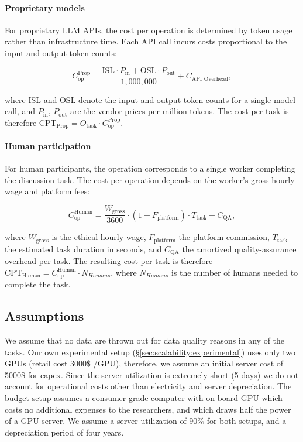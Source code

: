 \paragraph{Proprietary models}

For proprietary LLM APIs, the cost per operation is determined by token usage rather than infrastructure time. Each API call incurs costs proportional to the input and output token counts:

\[
C_{\text{op}}^{\text{Prop}} =
\frac{\text{ISL} \cdot P_{\text{in}} +
	\text{OSL} \cdot P_{\text{out}}}{1{,}000{,}000}
+ C_{\text{API Overhead}},
\]

where ISL and OSL denote the input and output token counts for a single model call, and $P_{\text{in}}$, $P_{\text{out}}$ are the vendor prices per million tokens. The cost per task is therefore $
\text{CPT}_{\text{Prop}} =
O_{\text{task}} \cdot C_{\text{op}}^{\text{Prop}}
$.		

\paragraph{Human participation}

For human participants, the operation corresponds to a single worker completing the discussion task. The cost per operation depends on the worker's gross hourly wage and platform fees:

\[
C_{\text{op}}^{\text{Human}} =
\frac{W_{\text{gross}}}{3600}
\cdot (1 + F_{\text{platform}})
\cdot T_{\text{task}}
+ C_{\text{QA}},
\]

where $W_{\text{gross}}$ is the ethical hourly wage, $F_{\text{platform}}$ the platform commission, $T_{\text{task}}$ the estimated task duration in seconds, and $C_{\text{QA}}$ the amortized quality-assurance overhead per task. The resulting cost per task is therefore $
\text{CPT}_{\text{Human}} =
C_{\text{op}}^{\text{Human}} \cdot N_{Humans}
$, where $N_{Humans}$ is the number of humans needed to complete the task.


\subsection{Assumptions}
\label{sec:appendix:cost:assumptions}

We assume that no data are thrown out for data quality reasons in any of the tasks. Our own experimental setup (\S\ref{sec:scalability:experimental}) uses only two GPUs (retail cost 3000\$ /GPU), therefore, we assume an initial server cost of 5000\$ for \ac{capex}. Since the server utilization is extremely short (5 days) we do not account for operational costs other than electricity and server depreciation. The budget setup assumes a consumer-grade computer with on-board GPU which costs no additional expenses to the researchers, and which draws half the power of a GPU server. We assume a server utilization of 90\% for both setups, and a depreciation period of four years.

